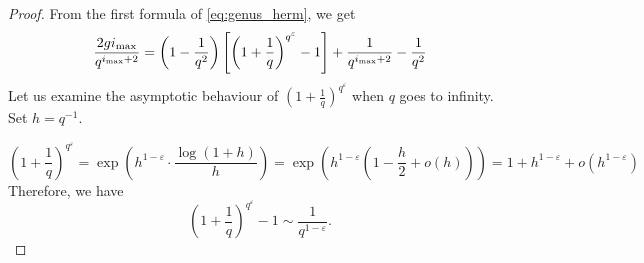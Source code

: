 \documentclass[a4paper,USenglish,autoref]{lipics-v2021}
\renewcommand\epsilon{\varepsilon}
\newcommand{\ii}{i_{\rm{max}}}
\begin{document}
\begin{proof}
	From the first formula of \eqref{eq:genus_herm}, we get
	\[\frac{2g{\ii}}{q^{\ii+2}}=\left(1-\frac{1}{q^2}\right)\left[\left(1+\frac{1}{q}\right)^{q^\epsilon}-1\right]+\frac{1}{q^{\ii+2}}-\frac{1}{q^2}\]
	Let us examine the asymptotic behaviour of $\left(1+\frac{1}{q}\right)^{q^\epsilon}$ when $q$ goes to infinity. Set $h = q^{-1}$.
	
	\[\left(1+\frac{1}{q}\right)^{q^\epsilon}=\exp\left(h^{1-\epsilon}\cdot\frac{\log(1+h)}{h}\right)=\exp\left(h^{1-\epsilon}\left(1-\frac{h}{2}+o(h)\right)\right)=1+h^{1-\epsilon}+o(h^{1-\epsilon})\]
	Therefore, we have
	\[\left(1+\frac{1}{q}\right)^{q^\epsilon}-1 \sim \frac{1}{q^{1-\epsilon}}.\]
\end{proof}
\end{document}
